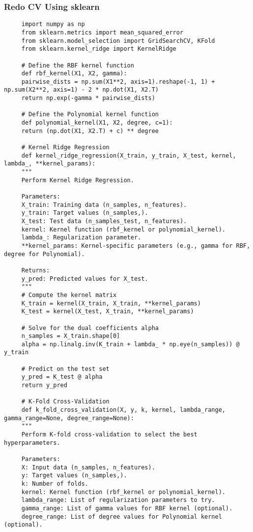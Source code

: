 \documentclass[letterpaper]{article}
\begin{document}
\subsubsection{Redo CV Using sklearn}
\begin{lstlisting}
     import numpy as np
     from sklearn.metrics import mean_squared_error
     from sklearn.model_selection import GridSearchCV, KFold
     from sklearn.kernel_ridge import KernelRidge
     
     # Define the RBF kernel function
     def rbf_kernel(X1, X2, gamma):
     pairwise_dists = np.sum(X1**2, axis=1).reshape(-1, 1) + np.sum(X2**2, axis=1) - 2 * np.dot(X1, X2.T)
     return np.exp(-gamma * pairwise_dists)
     
     # Define the Polynomial kernel function
     def polynomial_kernel(X1, X2, degree, c=1):
     return (np.dot(X1, X2.T) + c) ** degree
     
     # Kernel Ridge Regression
     def kernel_ridge_regression(X_train, y_train, X_test, kernel, lambda_, **kernel_params):
     """
     Perform Kernel Ridge Regression.
     
     Parameters:
     X_train: Training data (n_samples, n_features).
     y_train: Target values (n_samples,).
     X_test: Test data (n_samples_test, n_features).
     kernel: Kernel function (rbf_kernel or polynomial_kernel).
     lambda_: Regularization parameter.
     **kernel_params: Kernel-specific parameters (e.g., gamma for RBF, degree for Polynomial).
     
     Returns:
     y_pred: Predicted values for X_test.
     """
     # Compute the kernel matrix
     K_train = kernel(X_train, X_train, **kernel_params)
     K_test = kernel(X_test, X_train, **kernel_params)
     
     # Solve for the dual coefficients alpha
     n_samples = X_train.shape[0]
     alpha = np.linalg.inv(K_train + lambda_ * np.eye(n_samples)) @ y_train
     
     # Predict on the test set
     y_pred = K_test @ alpha
     return y_pred
     
     # K-Fold Cross-Validation
     def k_fold_cross_validation(X, y, k, kernel, lambda_range, gamma_range=None, degree_range=None):
     """
     Perform K-fold cross-validation to select the best hyperparameters.
     
     Parameters:
     X: Input data (n_samples, n_features).
     y: Target values (n_samples,).
     k: Number of folds.
     kernel: Kernel function (rbf_kernel or polynomial_kernel).
     lambda_range: List of regularization parameters to try.
     gamma_range: List of gamma values for RBF kernel (optional).
     degree_range: List of degree values for Polynomial kernel (optional).
     

\end{lstlisting}
\end{document}
